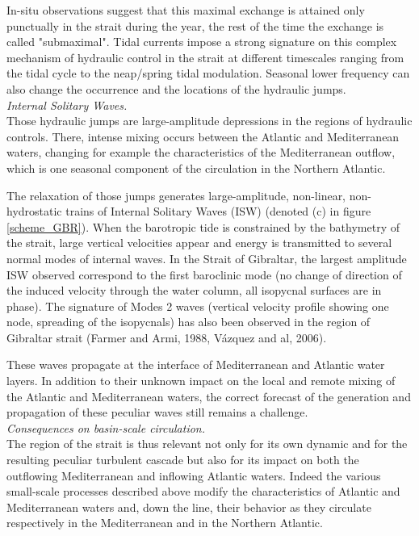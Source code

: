 In-situ observations suggest that this maximal exchange is attained only punctually in the strait during the year, the rest of the time the exchange is called "submaximal". Tidal currents impose a strong signature on this complex mechanism of hydraulic control in the strait at different timescales ranging from the tidal cycle to the neap/spring tidal modulation. Seasonal lower frequency can also change the occurrence and the locations of the hydraulic jumps.\\

\textit{Internal Solitary Waves.}\\
Those hydraulic jumps are large-amplitude depressions in the regions of hydraulic controls. There, intense mixing occurs between the Atlantic and Mediterranean waters, changing for example the characteristics of the Mediterranean outflow, which is one seasonal component of the circulation in the Northern Atlantic. 

The relaxation of those jumps generates large-amplitude, non-linear, non-hydrostatic trains of Internal Solitary Waves (ISW) (denoted (c) in figure \ref{scheme_GBR}). When the barotropic tide is constrained by the bathymetry of the strait, large vertical velocities appear and energy is transmitted to several normal modes of internal waves. In the Strait of Gibraltar, the largest amplitude ISW observed correspond to the first baroclinic mode (no change of direction of the induced velocity through the water column, all isopycnal surfaces are in phase). The signature of Modes 2 waves (vertical velocity profile showing one node, spreading of the isopycnals) has also been observed in the region of Gibraltar strait (Farmer and Armi, 1988, V\'azquez and al, 2006).

These waves propagate at the interface of Mediterranean and Atlantic water layers. In addition to their unknown impact on the local and remote mixing of the Atlantic and Mediterranean waters, the correct forecast of the generation and propagation of these peculiar waves still remains a challenge. \\

\textit{Consequences on basin-scale circulation.}\\
The region of the strait is thus relevant not only for its own dynamic and for the resulting peculiar turbulent cascade but also for its impact on both the outflowing Mediterranean and inflowing Atlantic waters. Indeed the various small-scale processes described above modify the characteristics of Atlantic and Mediterranean waters and, down the line, their behavior as they circulate respectively in the Mediterranean and in the Northern Atlantic.

